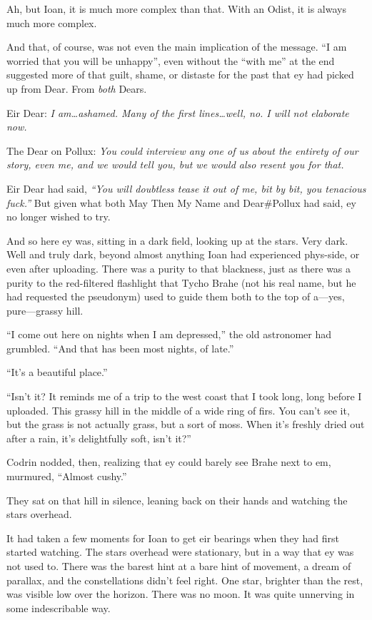 Ah, but Ioan, it is much more complex than that. With an Odist, it is always much more complex.

And that, of course, was not even the main implication of the message. ``I am worried that you will be unhappy'', even without the ``with me'' at the end suggested more of that guilt, shame, or distaste for the past that ey had picked up from Dear. From \emph{both} Dears.

Eir Dear: \emph{I am\ldots ashamed. Many of the first lines\ldots well, no. I will not elaborate now.}

The Dear on Pollux: \emph{You could interview any one of us about the entirety of our story, even me, and we would tell you, but we would also resent you for that.}

Eir Dear had said, \emph{``You will doubtless tease it out of me, bit by bit, you tenacious fuck.''} But given what both May Then My Name and Dear\#Pollux had said, ey no longer wished to try.

And so here ey was, sitting in a dark field, looking up at the stars. Very dark. Well and truly dark, beyond almost anything Ioan had experienced phys-side, or even after uploading. There was a purity to that blackness, just as there was a purity to the red-filtered flashlight that Tycho Brahe (not his real name, but he had requested the pseudonym) used to guide them both to the top of a---yes, pure---grassy hill.

``I come out here on nights when I am depressed,'' the old astronomer had grumbled. ``And that has been most nights, of late.''

``It's a beautiful place.''

``Isn't it? It reminds me of a trip to the west coast that I took long, long before I uploaded. This grassy hill in the middle of a wide ring of firs. You can't see it, but the grass is not actually grass, but a sort of moss. When it's freshly dried out after a rain, it's delightfully soft, isn't it?''

Codrin nodded, then, realizing that ey could barely see Brahe next to em, murmured, ``Almost cushy.''

They sat on that hill in silence, leaning back on their hands and watching the stars overhead.

It had taken a few moments for Ioan to get eir bearings when they had first started watching. The stars overhead were stationary, but in a way that ey was not used to. There was the barest hint at a bare hint of movement, a dream of parallax, and the constellations didn't feel right. One star, brighter than the rest, was visible low over the horizon. There was no moon. It was quite unnerving in some indescribable way.

